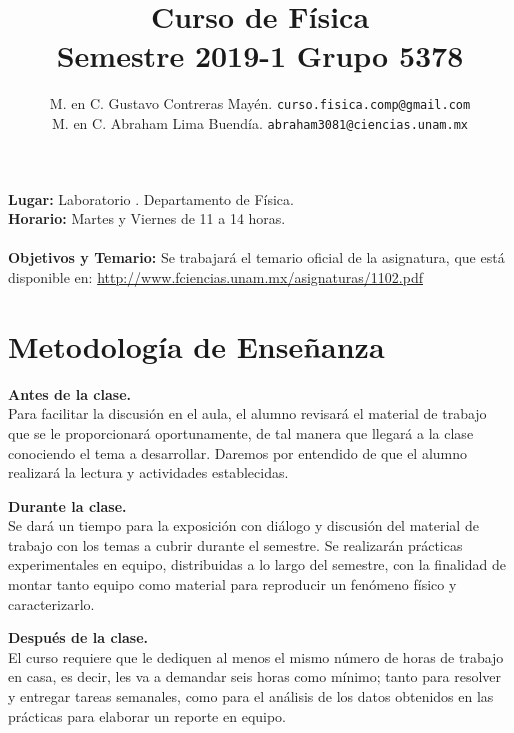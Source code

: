 \documentclass[12pt]{article}
\author{M. en C. Gustavo Contreras Mayén. \texttt{curso.fisica.comp@gmail.com}\\
M. en C. Abraham Lima Buendía. \texttt{abraham3081@ciencias.unam.mx}}
\title{Curso de Física\\{\large Semestre 2019-1 Grupo 5378}}
\date{ }
\begin{document}
\renewcommand\labelenumii{\theenumi.{\arabic{enumii}}}
\maketitle
\fontsize{12}{12}\selectfont
\textbf{Lugar: }Laboratorio . Departamento de Física.
\\
\textbf{Horario: } Martes y Viernes de 11 a 14 horas.
\\
\\
\textbf{Objetivos y Temario:} Se trabajará el temario oficial de la asignatura, que está disponible en: \href{http://www.fciencias.unam.mx/asignaturas/1102.pdf}{http://www.fciencias.unam.mx/asignaturas/1102.pdf}
\section{Metodología de Enseñanza}
\textbf{Antes de la clase.}
\\
Para facilitar la discusión en el aula, el alumno revisará el material de trabajo que se le proporcionará oportunamente, de tal manera que llegará a la clase conociendo el tema a desarrollar. Daremos por entendido de que el alumno realizará la lectura y actividades establecidas.
\\
\par
\textbf{Durante la clase.}
\\
Se dará un tiempo para la exposición con diálogo y discusión del material de trabajo con los temas a cubrir durante el semestre. Se realizarán prácticas experimentales en equipo, distribuidas a lo largo del semestre, con la finalidad de montar tanto equipo como material para reproducir un fenómeno físico y caracterizarlo.
\\
\par
\textbf{Después de la clase.}
\\
El curso requiere que le dediquen al menos el mismo número de horas de trabajo en casa, es decir, les va a demandar seis horas como mínimo; tanto para resolver y entregar tareas semanales, como para el análisis de los datos obtenidos en las prácticas para elaborar un reporte en equipo.
\end{document}
